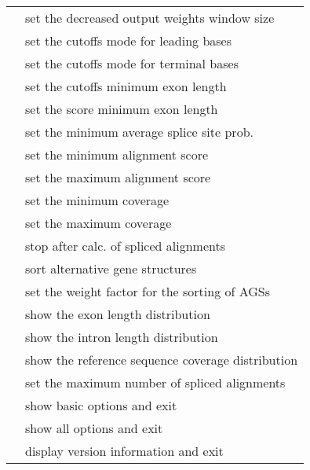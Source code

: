 \begin{supertabular}{ll}
\\
& set the decreased output weights window size
\\
& set the cutoffs mode for leading bases
\\
& set the cutoffs mode for terminal bases
\\
& set the cutoffs minimum exon length
\\
& set the score minimum exon length
\\
& set the minimum average splice site prob.
\\
& set the minimum alignment score
\\
& set the maximum alignment score
\\
& set the minimum coverage
\\
& set the maximum coverage
\\
& stop after calc. of spliced alignments
\\
& sort alternative gene structures
\\
& set the weight factor for the sorting of AGSs
\\
& show the exon length distribution
\\
& show the intron length distribution
\\
& show the reference sequence coverage distribution
\\
& set the maximum number of spliced alignments
\\
& show basic options and exit
\\
& show all options and exit
\\
& display version information and exit
\\
\hline
\end{supertabular}
